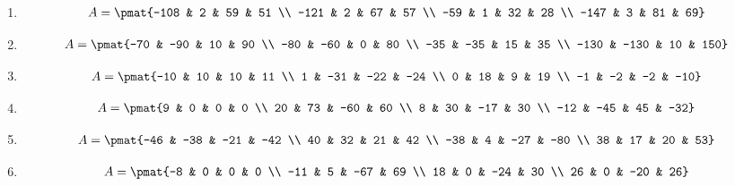 \begin{enumerate}
\item

\begin{align*}
A = \pmat{-108 & 2 & 59 & 51 \\ -121 & 2 & 67 & 57 \\ -59 & 1 & 32 & 28 \\ -147 & 3 & 81 & 69}
\end{align*}

\item

\begin{align*}
A = \pmat{-70 & -90 & 10 & 90 \\ -80 & -60 & 0 & 80 \\ -35 & -35 & 15 & 35 \\ -130 & -130 & 10 & 150}
\end{align*}

\item

\begin{align*}
A = \pmat{-10 & 10 & 10 & 11 \\ 1 & -31 & -22 & -24 \\ 0 & 18 & 9 & 19 \\ -1 & -2 & -2 & -10}
\end{align*}

\item

\begin{align*}
A = \pmat{9 & 0 & 0 & 0 \\ 20 & 73 & -60 & 60 \\ 8 & 30 & -17 & 30 \\ -12 & -45 & 45 & -32}
\end{align*}

\item

\begin{align*}
A = \pmat{-46 & -38 & -21 & -42 \\ 40 & 32 & 21 & 42 \\ -38 & 4 & -27 & -80 \\ 38 & 17 & 20 & 53}
\end{align*}

\item

\begin{align*}
A = \pmat{-8 & 0 & 0 & 0 \\ -11 & 5 & -67 & 69 \\ 18 & 0 & -24 & 30 \\ 26 & 0 & -20 & 26}
\end{align*}


\end{enumerate}
